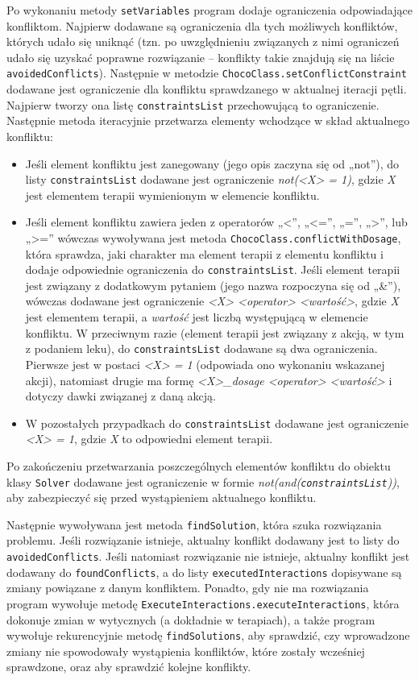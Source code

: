 Po wykonaniu metody \texttt{setVariables} program dodaje ograniczenia odpowiadające konfliktom. Najpierw dodawane są ograniczenia dla tych możliwych konfliktów, których udało się uniknąć (tzn. po uwzględnieniu związanych z nimi ograniczeń udało się uzyskać poprawne rozwiązanie -- konflikty takie znajdują się na liście \texttt{avoidedConflicts}). Następnie w metodzie \texttt{ChocoClass.set\-ConflictConstraint} dodawane jest ograniczenie dla konfliktu sprawdzanego w aktualnej iteracji pętli. Najpierw tworzy ona listę \texttt{constraintsList} przechowującą to ograniczenie. Następnie metoda iteracyjnie przetwarza elementy wchodzące w skład aktualnego konfliktu:
\begin{itemize}
\item Jeśli element konfliktu jest zanegowany (jego opis zaczyna się od „not”), do listy \texttt{constraints\-List} dodawane jest ograniczenie \textit{not(<X> = 1)}, gdzie \textit{X} jest elementem terapii wymienionym w elemencie konfliktu. 
\item Jeśli element konfliktu zawiera jeden z operatorów „<”, „<=”, „=”, „>”, lub „>=” wówczas wywoływana jest metoda \texttt{ChocoClass.conflictWithDosage}, która sprawdza, jaki charakter ma element terapii z elementu konfliktu i dodaje odpowiednie ograniczenia do \texttt{constraints\-List}. Jeśli element terapii jest związany z dodatkowym pytaniem (jego nazwa rozpoczyna się od „\&”), wówczas dodawane jest ograniczenie \textit{<X> <operator> <wartość>}, gdzie \textit{X} jest elementem terapii, a \textit{wartość} jest liczbą występującą w elemencie konfliktu. W przeciwnym razie (element terapii jest związany z akcją, w tym z podaniem leku), do \texttt{constraintsList} dodawane są dwa ograniczenia. Pierwsze jest w postaci \textit{<X> = 1} (odpowiada ono wykonaniu wskazanej akcji), natomiast drugie ma formę \textit{<X>\_dosage <operator> <wartość>} i dotyczy dawki związanej z daną akcją. 
\item W pozostałych przypadkach do \texttt{constraintsList} dodawane jest ograniczenie \textit{<X> = 1}, gdzie \textit{X} to odpowiedni element terapii.
\end{itemize}

Po zakończeniu przetwarzania poszczególnych elementów konfliktu do obiektu klasy \texttt{Solver} dodawane jest ograniczenie w formie \textit{not(and(\texttt{constraintsList}))}, aby zabezpieczyć się przed wystąpieniem aktualnego konfliktu.

Następnie wywoływana jest metoda \texttt{findSolution}, która szuka rozwiązania problemu. Jeśli rozwiązanie istnieje, aktualny konflikt dodawany jest to listy do \texttt{avoided\-Conflicts}. Jeśli natomiast rozwiązanie nie istnieje, aktualny konflikt jest dodawany do \texttt{foundConflicts}, a do listy \texttt{executedInteractions} dopisywane są zmiany powiązane z danym konfliktem. Ponadto, gdy nie ma rozwiązania program wywołuje metodę \texttt{ExecuteInteractions.execute\-Interactions}, która dokonuje zmian w wytycznych (a dokładnie w terapiach), a także program wywołuje rekurencyjnie metodę \texttt{findSolutions}, aby sprawdzić, czy wprowadzone zmiany nie spowodowały wystąpienia konfliktów, które zostały wcześniej sprawdzone, oraz aby sprawdzić kolejne konflikty. 

